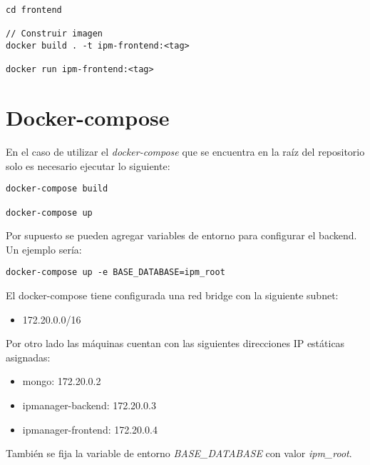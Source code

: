 \begin{lstlisting}
cd frontend

// Construir imagen
docker build . -t ipm-frontend:<tag>

docker run ipm-frontend:<tag>
\end{lstlisting}



\section{Docker-compose}

En el caso de utilizar el \textit{docker-compose} que se encuentra en la raíz del repositorio solo es necesario ejecutar lo siguiente:

\begin{lstlisting}
docker-compose build

docker-compose up
\end{lstlisting}

Por supuesto se pueden agregar variables de entorno para configurar el backend. Un ejemplo sería:

\begin{lstlisting}
docker-compose up -e BASE_DATABASE=ipm_root
\end{lstlisting}

El docker-compose tiene configurada una red bridge con la siguiente subnet:

\begin{itemize}
	\item 172.20.0.0/16
\end{itemize}

Por otro lado las máquinas cuentan con las siguientes direcciones IP estáticas asignadas:

\begin{itemize}
	\item mongo: 172.20.0.2
	\item ipmanager-backend: 172.20.0.3
	\item ipmanager-frontend: 172.20.0.4
\end{itemize}

También se fija la variable de entorno \textit{BASE\_DATABASE} con valor \textit{ipm\_root}.